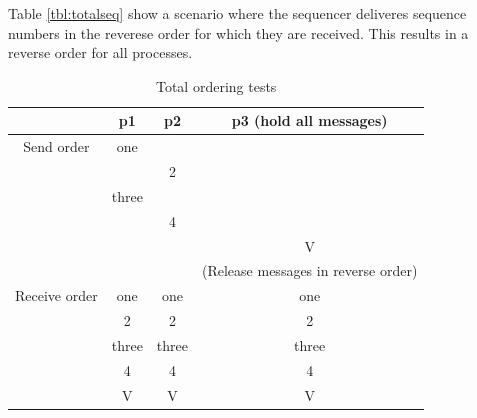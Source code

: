 \documentclass[titlepage, twocolumn, a4paper, 10pt]{article}
\begin{document}
Table \ref{tbl:totalseq} show a scenario where the sequencer deliveres
sequence numbers in the reverese order for which they are received.
This results in a reverse order for all processes.
\begin{table}[H]
  \centering
  \begin{footnotesize}
    \begin{tabular} {c | c | c | c}
      & p1 & p2 & p3 (hold all messages) \\
      \hline
      Send order & one &  &  \\
      &  & 2 &  \\
      & three &  &  \\
      &  & 4 &  \\
      &  &  & V \\
      \hline
      &  &  & (Release messages in reverse order) \\
      \hline
      Receive order & one & one & one \\
      & 2 & 2 & 2 \\
      & three & three & three \\
      & 4 & 4 & 4 \\
      & V & V & V \\
    \end{tabular}
  \end{footnotesize}
  \caption{Total ordering tests}
  \label{tbl:total}
\end{table}

\end{document}
